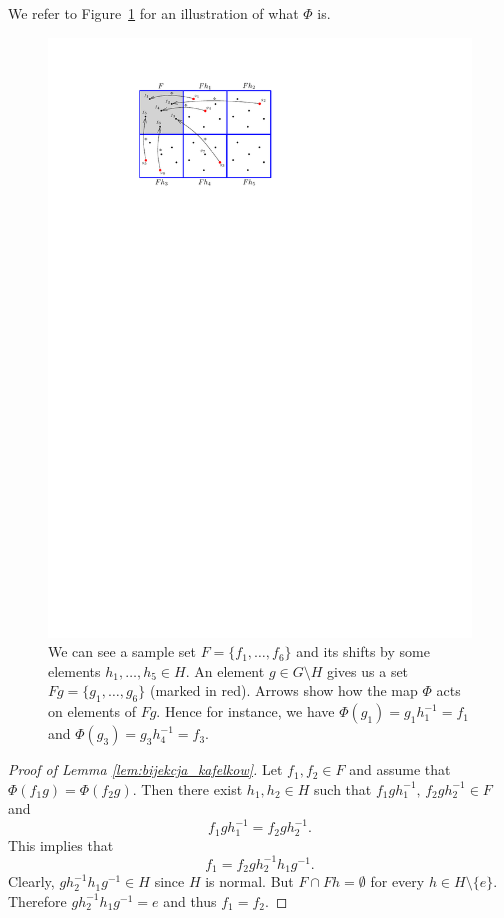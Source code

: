 \noindent
We refer to Figure~\ref{fig:bijekcja} for an illustration of what $\Phi$ is.
\begin{figure}
\centering
\includegraphics[scale=1.5]{../Graphics/obrazek_bijekcja}
\caption{We can see a sample set $F=\{f_1,\ldots,f_6\}$ and its shifts by some elements $h_1,\ldots, h_5\in H$. An element $g\in G\setminus H$ gives us a set $Fg=\{g_1,\ldots,g_6\}$ (marked in red). Arrows show how the map $\Phi$ acts on elements of $Fg$. Hence for instance, we have  $\Phi(g_1) = g_1h_1^{-1} = f_1$ and $\Phi(g_3) = g_3h_4^{-1} = f_3$. 
}\label{fig:bijekcja}
\end{figure}

\begin{proof}[Proof of Lemma \ref{lem:bijekcja_kafelkow}]
Let $f_1,f_2\in F$ and assume that $\Phi(f_1g)=\Phi(f_2g).$
Then there exist $h_1, h_2\in H$ such that $f_1gh_1^{-1},\,f_2gh_2^{-1}\in F$ and 
\[
f_1gh_1^{-1}=f_2gh_2^{-1}.
\]
This implies that
\[
f_1=f_2gh_2^{-1}h_1g^{-1}.
\]
Clearly, $gh_2^{-1}h_1g^{-1}\in H$ since $H$ is normal. But $F\cap Fh=\emptyset$ for every $h\in H\setminus\{e\}$. Therefore $gh_2^{-1}h_1g^{-1}=e$ and thus $f_1=f_2$.
\end{proof}


